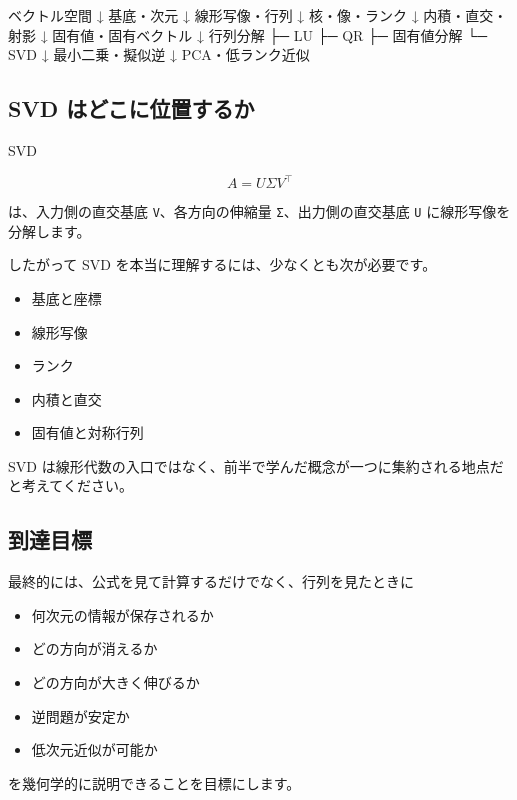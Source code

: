 \documentclass[
  11pt,
  a4paper,
]{ltjsarticle}
\newenvironment{Shaded}{}{}
\newcommand{\NormalTok}[1]{#1}
\providecommand{\tightlist}{%
  \setlength{\itemsep}{0pt}\setlength{\parskip}{0pt}}
\begin{document}
\begin{Shaded}
\begin{Highlighting}[]
\NormalTok{ベクトル空間}
\NormalTok{  ↓}
\NormalTok{基底・次元}
\NormalTok{  ↓}
\NormalTok{線形写像・行列}
\NormalTok{  ↓}
\NormalTok{核・像・ランク}
\NormalTok{  ↓}
\NormalTok{内積・直交・射影}
\NormalTok{  ↓}
\NormalTok{固有値・固有ベクトル}
\NormalTok{  ↓}
\NormalTok{行列分解}
\NormalTok{  ├─ LU}
\NormalTok{  ├─ QR}
\NormalTok{  ├─ 固有値分解}
\NormalTok{  └─ SVD}
\NormalTok{       ↓}
\NormalTok{   最小二乗・擬似逆}
\NormalTok{       ↓}
\NormalTok{   PCA・低ランク近似}
\end{Highlighting}
\end{Shaded}

\hypertarget{svd-ux306fux3069ux3053ux306bux4f4dux7f6eux3059ux308bux304b}{%
\subsection{SVD
はどこに位置するか}\label{svd-ux306fux3069ux3053ux306bux4f4dux7f6eux3059ux308bux304b}}

SVD

\[
A=U\Sigma V^\top
\]

は、入力側の直交基底 \texttt{V}、各方向の伸縮量
\texttt{Σ}、出力側の直交基底 \texttt{U} に線形写像を分解します。

したがって SVD を本当に理解するには、少なくとも次が必要です。

\begin{itemize}
\tightlist
\item
  基底と座標
\item
  線形写像
\item
  ランク
\item
  内積と直交
\item
  固有値と対称行列
\end{itemize}

SVD
は線形代数の入口ではなく、前半で学んだ概念が一つに集約される地点だと考えてください。

\hypertarget{ux5230ux9054ux76eeux6a19}{%
\subsection{到達目標}\label{ux5230ux9054ux76eeux6a19}}

最終的には、公式を見て計算するだけでなく、行列を見たときに

\begin{itemize}
\tightlist
\item
  何次元の情報が保存されるか
\item
  どの方向が消えるか
\item
  どの方向が大きく伸びるか
\item
  逆問題が安定か
\item
  低次元近似が可能か
\end{itemize}

を幾何学的に説明できることを目標にします。
\end{document}
